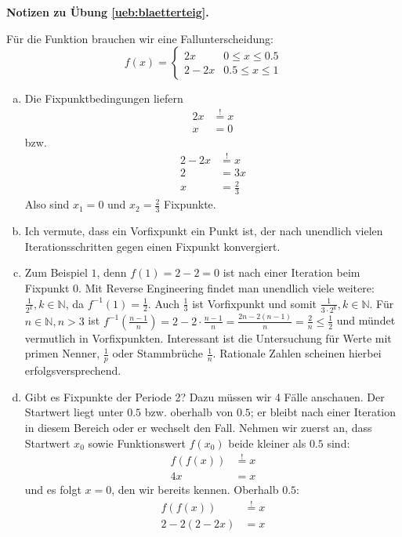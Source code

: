 \documentclass[%
11pt,%
twoside,%
titlepage,%
german,%
headsepline%
]{scrartcl}
\newcommand{\concatueb}[1]{ueb:#1}%
\newcommand{\concatlsg}[1]{lsg:#1}%
\newenvironment{lsg}[1]{%
    \par\noindent\textbf{Notizen zu Übung \ref{\concatueb{#1}}.}%
    \label{\concatlsg{#1}}
}{%
    \par%
}
\begin{document}
\begin{lsg}{blaetterteig}
F\"ur die Funktion brauchen wir eine Fallunterscheidung:
$$f(x)=\begin{cases}
2x & 0\leq x\leq0.5\\
2-2x & 0.5\leq x\leq1
\end{cases}$$

\begin{enumerate}[a)]
\item Die Fixpunktbedingungen liefern
\begin{align*}
2x &\stackrel{!}{=} x\\
x &= 0
\end{align*}
bzw.
\begin{align*}
2-2x &\stackrel{!}{=} x\\
2 &= 3x\\
x &=\frac{2}{3}
\end{align*}
Also sind $x_{1}=0$ und $x_{2}=\frac{2}{3}$ Fixpunkte.
\item Ich vermute, dass ein Vorfixpunkt ein Punkt ist, der nach unendlich vielen Iterationsschritten gegen einen Fixpunkt konvergiert.
\item Zum Beispiel $1$, denn $f(1)=2-2=0$ ist nach einer Iteration beim Fixpunkt $0$. Mit Reverse Engineering findet man unendlich viele weitere: $\frac{1}{2^{k}}, k\in\mathbb{N}$, da $f^{-1}(1)=\frac{1}{2}$. Auch $\frac{1}{3}$ ist Vorfixpunkt und somit $\frac{1}{3\cdot2^{k}}, k\in\mathbb{N}$. F\"ur $n\in\mathbb{N}, n>3$ ist $f^{-1}(\frac{n-1}{n})=2-2\cdot\frac{n-1}{n}=\frac{2n-2(n-1)}{n}=\frac{2}{n}\leq\frac{1}{2}$ und m\"undet vermutlich in Vorfixpunkten. Interessant ist die Untersuchung f\"ur Werte mit primen Nenner, $\frac{1}{p}$ oder Stammbr\"uche $\frac{1}{n}$. Rationale Zahlen scheinen hierbei erfolgsversprechend.
\item Gibt es Fixpunkte der Periode 2? Dazu m\"ussen wir 4 F\"alle anschauen. Der Startwert liegt unter $0.5$ bzw. oberhalb von $0.5$; er bleibt nach einer Iteration in diesem Bereich oder er wechselt den Fall. Nehmen wir zuerst an, dass Startwert $x_{0}$ sowie Funktionswert $f(x_{0})$ beide kleiner als $0.5$ sind:
\begin{align*}
f(f(x)) &\stackrel{!}{=} x\\
4x &= x
\end{align*}
und es folgt $x=0$, den wir bereits kennen. Oberhalb $0.5$:
\begin{align*}
f(f(x)) &\stackrel{!}{=} x\\
2-2(2-2x) &= x\\

\end{align*}
\end{enumerate}
\end{lsg}
\end{document}
